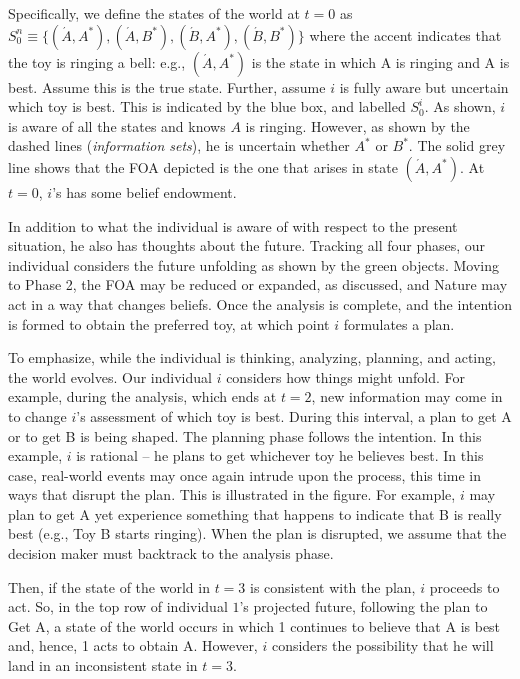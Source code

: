 \documentclass[
11pt,
titlepage,
reqno,
]{article}%
\theoremstyle{definition}
\begin{document}
Specifically, we define the states of the world at $t=0$ as $S^n_0\equiv \{(\acute{A},A^\ast),(\acute{A},B^\ast),(\acute{B},A^\ast),(\acute{B},B^\ast)\}$ where the accent indicates that the toy is ringing a bell: e.g., $(\acute{A},A^\ast)$ is the state in which A is ringing and A is best. Assume this is the true state. Further, assume $i$ is fully aware but uncertain which toy is best. This is indicated by the blue box, and labelled $S^i_0$. As shown, $i$ is aware of all the states and knows $A$ is ringing. However, as shown by the dashed lines (\textit{information sets}), he is uncertain whether $A^\ast$ or $B^\ast$. The solid grey line shows that the FOA depicted is the one that arises in state $(\acute{A},A^\ast)$. At $t=0$, $i$'s has some belief endowment. 


In addition to what the individual is aware of with respect to the present situation, he also has thoughts about the future. Tracking all four phases, our individual considers the future unfolding as shown by the green objects. Moving to Phase 2, the FOA may be reduced or expanded, as discussed, and Nature may act in a way that changes beliefs. Once the analysis is complete, and the intention is formed to obtain the preferred toy, at which point $i$ formulates a plan. 

To emphasize, while the individual is thinking, analyzing, planning, and acting, the world evolves. Our individual $i$ considers how things might unfold. For example, during the analysis, which ends at $t=2$, new information may come in to change $i$'s assessment of which toy is best. During this interval, a plan to get A or to get B is being shaped. The planning phase follows the intention. In this example, $i$ is rational -- he plans to get whichever toy he believes best. In this case, real-world events may once again intrude upon the process, this time in ways that disrupt the plan. This is illustrated in the figure. For example, $i$ may plan to get A yet experience something that happens to indicate that B is really best (e.g., Toy B starts  ringing). When the plan is disrupted, we assume that the decision maker must backtrack to the analysis phase.

Then, if the state of the world in $t=3$ is consistent with the plan, $i$ proceeds to act. So, in the top row of individual $1$'s projected future, following the plan to Get A, a state of the world occurs in which 1 continues to believe that A is best and, hence, 1 acts to obtain A. However, $i$ considers the possibility that he will land in an inconsistent state in $t=3$. 
\end{document}
